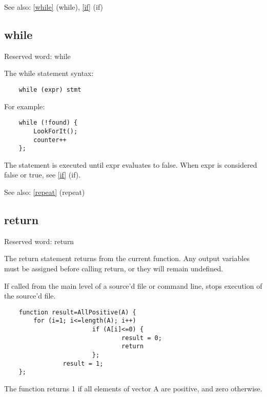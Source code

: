 \documentclass[a4paper]{article}
\begin{document}
See also: \ref{while} {(while)}, \ref{if} {(if)}




\subsection{while\label{while}}

Reserved word: while

The while statement syntax:

\begin{tscreen}
\begin{verbatim}
    while (expr) stmt
\end{verbatim}
\end{tscreen}


For example:

\begin{tscreen}
\begin{verbatim}
    while (!found) {
        LookForIt();
        counter++
    };
\end{verbatim}
\end{tscreen}


The statement is executed until expr evaluates to false.
When expr is considered false or true, see \ref{if} {(if)}.

See also: \ref{repeat} {(repeat)}




\subsection{return\label{return}}

Reserved word: return

The return statement returns from the current function.
Any output variables must be assigned before calling
return, or they will remain undefined.

If called from the main level of a source'd file or
command line, stops execution of the source'd file.

\begin{tscreen}
\begin{verbatim}
    function result=AllPositive(A) {
        for (i=1; i<=length(A); i++)
                        if (A[i]<=0) {
                                result = 0;
                                return
                        };
                result = 1;
    };
\end{verbatim}
\end{tscreen}


The function returns 1 if all elements of vector A are
positive, and zero otherwise.
\end{document}
